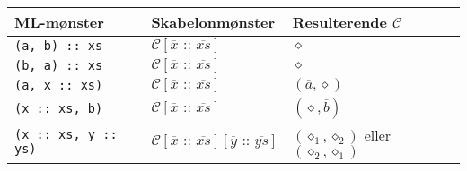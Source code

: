   \begin{example} \ 


    \begin{tabular}{l|l|l} 
      ML-mønster & Skabelonmønster & Resulterende
      $\mathcal{C}$ \\ \hline
      
      \texttt{(a, b) :: xs} & $\mathcal{C}[\overline{x} \texttt{ :: } \overline{xs}]$ &
      $\diamond$ \\

      \texttt{(b, a) :: xs} & $\mathcal{C}[\overline{x} \texttt{ :: } \overline{xs}]$ &
      $\diamond$ \\

      \texttt{(a, x :: xs)} & $\mathcal{C}[\overline{x} \texttt{ :: } \overline{xs}]$ &
      $(\overline{a}, \diamond)$ \\

      \texttt{(x :: xs, b)} & $\mathcal{C}[\overline{x} \texttt{ :: } \overline{xs}]$ &
      $(\diamond, \overline{b})$ \\

      \texttt{(x :: xs, y :: ys)} & $\mathcal{C}[\overline{x} \texttt{ :: }
      \overline{xs}][\overline{y} \texttt{ :: } \overline{ys}]$ &
      $(\diamond_1, \diamond_2)$ eller $(\diamond_2, \diamond_1)$\\
      
    \end{tabular}
    
  \end{example}





